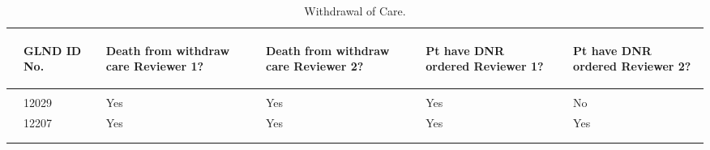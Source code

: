 \documentclass[dvips,10pt]{article}
\begin{document}
\begin{table}[t]
\caption
{ Withdrawal of Care. }
\begin{center}
\begin{tabular}{ @{}l@{}
@{}l@{}@{}p{1.5em}@{}@{}p{1.0in}@{}@{}p{1.5em}@{}@{}p{1.0in}@{}@{}p{1.5em}@{}@{}p{1.0in}@{}@{}p{1.5em}@{}@{}p{1.0in}@{}
}
\hline

& \parbox{6em}{\begin{center}GLND ID No.\end{center}} && \parbox{6em}{\begin{center}Death from withdraw care Reviewer 1?\end{center}} && \parbox{6em}{\begin{center}Death from withdraw care Reviewer 2?\end{center}} && \parbox{6em}{\begin{center}Pt have DNR ordered Reviewer 1?\end{center}} && \parbox{6em}{\begin{center}Pt have DNR ordered Reviewer 2?\end{center}} \\

\hline

\\
& 12029 && Yes && Yes && Yes && No \\
& 12207 && Yes && Yes && Yes && Yes \\
\\
\hline \\

\end{tabular}

\end{center}
 \end{table}
\clearpage
\end{document}
